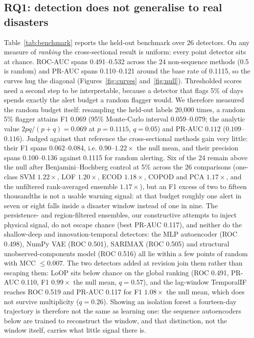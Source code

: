 \documentclass[preprint,12pt]{elsarticle}
\begin{document}
\subsection{RQ1: detection does not generalise to real disasters}
\label{sec:rq1}
Table~\ref{tab:benchmark} reports the held-out benchmark over 26 detectors. On
any measure of \emph{ranking} the cross-sectional result is uniform: every
point detector sits at chance. ROC-AUC spans 0.491--0.532 across the 24
non-sequence methods (0.5 is random) and PR-AUC spans 0.110--0.121 around the
base rate of 0.1115, so the curves hug the diagonal
(Figures~\ref{fig:curves} and~\ref{fig:null}). Thresholded scores need a second
step to be interpretable, because a detector that flags 5\% of days spends
exactly the alert budget a random flagger would. We therefore measured the
random budget itself: resampling the held-out labels 20{,}000 times, a random
5\% flagger attains F1 $0.069$ (95\% Monte-Carlo interval $0.059$--$0.079$;
the analytic value $2pq/(p+q)=0.069$ at $p=0.1115$, $q=0.05$) and PR-AUC
$0.112$ ($0.109$--$0.116$). Judged against that reference the cross-sectional
methods gain very little: their F1 spans 0.062--0.084, i.e. $0.90$--$1.22\times$
the null mean, and their precision spans 0.100--0.136 against 0.1115 for random
alerting. Six of the 24 remain above the null after Benjamini--Hochberg control
at 5\% across the 26 comparisons (one-class SVM $1.22\times$, LOF $1.20\times$,
ECOD $1.18\times$, COPOD and PCA $1.17\times$, and the unfiltered rank-averaged
ensemble $1.17\times$), but an F1 excess of two to fifteen thousandths is not a
usable warning signal: at that budget roughly one alert in seven or eight falls
inside a disaster window instead of one in nine. The
persistence- and region-filtered ensembles, our constructive attempts to inject
physical signal, do not escape chance (best PR-AUC 0.117), and neither do the
shallow-deep and innovation-temporal detectors: the MLP autoencoder (ROC 0.498),
NumPy VAE (ROC 0.501), SARIMAX (ROC 0.505) and structural unobserved-components
model (ROC 0.516) all lie within a few points of random with MCC $\le 0.007$.
The two detectors added at revision join them rather than escaping them: LoOP
sits below chance on the global ranking (ROC 0.491, PR-AUC 0.110, F1 $0.99\times$
the null mean, $q=0.57$), and the lag-window TemporalIF reaches ROC 0.519 and
PR-AUC 0.117 for F1 $1.08\times$ the null mean, which does not survive
multiplicity ($q=0.26$). Showing an isolation forest a fourteen-day trajectory is
therefore not the same as learning one: the sequence autoencoders below are
trained to reconstruct the window, and that distinction, not the window itself,
carries what little signal there is.
\end{document}

